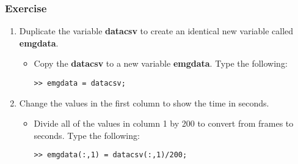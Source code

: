 \documentclass[12pt,a4paper]{article}
\begin{document}
\subsubsection*{Exercise}
\begin{enumerate}
	\item Duplicate the variable \textbf{datacsv} to create an identical new variable called \textbf{emgdata}.
	\begin{itemize}
		\item Copy the \textbf{datacsv} to a new variable \textbf{emgdata}.  Type the following:
		\begin{lstlisting}[style=Matlab-editor]
>> emgdata = datacsv;
		\end{lstlisting}		
	\end{itemize}
	
	\item Change the values in the first column to show the time in seconds.	
	\begin{itemize}
		\item Divide all of the values in column 1 by 200 to convert from frames to seconds. Type the following:
		\begin{lstlisting}[style=Matlab-editor]
>> emgdata(:,1) = datacsv(:,1)/200;
		\end{lstlisting}		
	\end{itemize}	
	

\end{enumerate}
\end{document}
